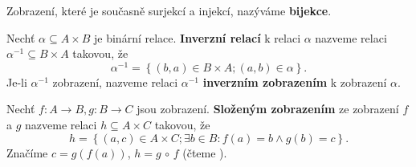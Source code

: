 \begin{definition}
  Zobrazení, které je současně surjekcí a injekcí, nazýváme \textbf{bijekce}.
\end{definition}

\begin{definition}
  Nechť $\alpha \subseteq A\times B$ je binární relace. \textbf{Inverzní relací} k relaci $\alpha$ nazveme relaci $\alpha^{-1} \subseteq B\times A$ takovou, že
  \[
    \alpha^{-1}=\left\{ (b,a)\in B\times A;  (a,b)\in \alpha\right\}.
  \]
  Je-li $\alpha^{-1}$ zobrazení, nazveme relaci $\alpha ^{-1}$ \textbf{inverzním zobrazením} k zobrazení $\alpha$.
\end{definition}

\begin{definition}
  Nechť $f:A\to B, g:B\to C$ jsou zobrazení. \textbf{Složeným zobrazením} ze zobrazení $f$ a $g$ nazveme relaci $h\subseteq A\times C$ takovou, že
  \[
    h=\left\{ (a,c)\in A\times C;\exists b\in B: f(a)=b \land g(b)=c \right\}.
  \]
  Značíme $c=g(f(a))$, $h=g\, \circ \, f $ (čteme ).
\end{definition}
